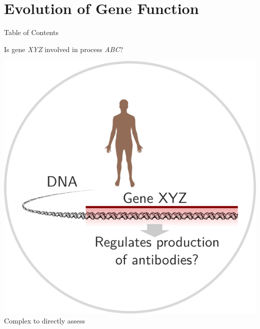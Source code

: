 \documentclass[10pt,aspectratio=169]{beamer}
\newcounter{frame}[frame]
\newcommand{\toc}[0]{\begin{frame}{Table of Contents}
    \tableofcontents[current]
\end{frame}}
\begin{document}
\section{Evolution of Gene Function}
\toc{}

\begin{frame}[c]
	
	\Large Is gene \textit{XYZ} involved in process \textit{ABC}?\normalsize\bigskip
	
	\begin{minipage}[t]{.33\linewidth}
		\centering
		\includegraphics[width=1\linewidth]{aphylo-data-0.png} \\
		Complex to directly assess
	\end{minipage}\hfill
\end{frame}
\end{document}
